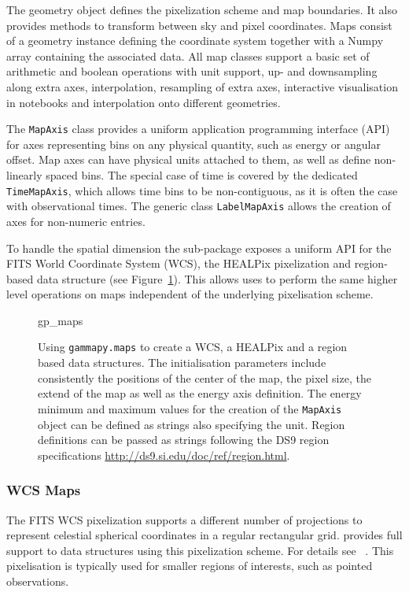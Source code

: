 \documentclass[traditabstract, longauth]{aa}
\newcommand{\code}[1]{\texttt{#1}}
\begin{document}
{The geometry object defines the pixelization scheme and map boundaries. It also
provides methods to transform between sky and pixel coordinates. Maps consist
of a geometry instance defining the coordinate system together with a
Numpy array containing the associated data. All map classes support a basic
set of arithmetic and boolean operations with  unit support, up- and downsampling
along extra axes, interpolation, resampling of extra axes, interactive visualisation
in notebooks and interpolation onto different geometries.

The \code{MapAxis} class provides a uniform application programming interface
(API) for axes representing
bins on any physical quantity, such as energy or angular offset.
Map axes can have physical units attached to them, as well as define
non-linearly spaced bins. The special case of time is covered by the
dedicated \code{TimeMapAxis}, which allows time bins to be non-contiguous,
as it is often the case with observational times. The generic
class \code{LabelMapAxis} allows the creation of axes for non-numeric entries.

To handle the spatial dimension the sub-package exposes a uniform API for
the FITS World Coordinate System (WCS), the HEALPix pixelization and
region-based data structure (see Figure~\ref{ig*:minted:gp_maps}).
This allows uses to perform the same higher level operations on maps
independent of the underlying pixelisation scheme.

\begin{figure}
	\small
	{gp_maps}

	\caption{
        Using \code{gammapy.maps} to create a WCS, a HEALPix and a region
		based data structures. The initialisation parameters include
        consistently the positions of the center of the map, the pixel
        size, the extend of the map as well as the energy axis definition.
        The energy minimum and maximum values for the creation of the
        \code{MapAxis} object can be defined as strings also specifying the
        unit. Region definitions can be passed as strings following
        the DS9 region specifications \url{http://ds9.si.edu/doc/ref/region.html}.
        }
    \label{ig*:minted:gp_maps}
\end{figure}

\subsubsection{WCS Maps}
The FITS WCS pixelization supports a different number of projections to
represent celestial spherical coordinates in a regular rectangular grid.
\gammapy provides full support to data structures using this pixelization
scheme. For details see ~\cite{Calabretta2002}. This pixelisation
is typically used for smaller regions of interests, such as pointed
observations.


}
\end{document}
